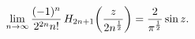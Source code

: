 \[\lim_{n\to\infty}\frac{(-1)^{n}}{2^{2n}n!}\mathop{H_{2n+1}\/}\nolimits\!\left(%
\frac{z}{2n^{\frac{1}{2}}}\right)=\frac{2}{\pi^{\frac{1}{2}}}\mathop{\sin\/}%
\nolimits z.\]